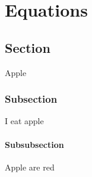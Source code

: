 \chapter{Equations}

   \section{Section}
        Apple
        \subsection{Subsection}
            I eat apple
        \subsubsection{Subsubsection}
            Apple are red


